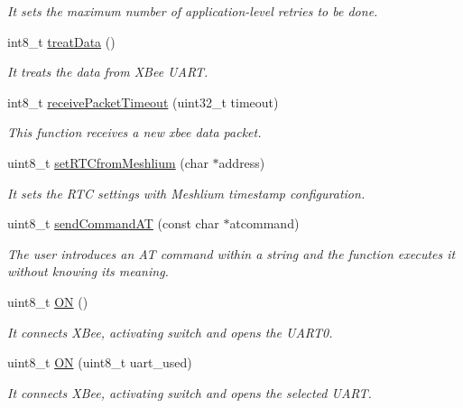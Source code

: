 \begin{DoxyCompactItemize}
\begin{DoxyCompactList}\small\item\em It sets the maximum number of application-\/level retries to be done. \end{DoxyCompactList}\item 
int8\+\_\+t \hyperlink{class_wasp_x_bee_core_ad926c5d5d906579b0be4de7623989cad}{treat\+Data} ()
\begin{DoxyCompactList}\small\item\em It treats the data from X\+Bee U\+A\+RT. \end{DoxyCompactList}\item 
int8\+\_\+t \hyperlink{class_wasp_x_bee_core_aecef582d03cbb816a14f6ff32a6d3520}{receive\+Packet\+Timeout} (uint32\+\_\+t timeout)
\begin{DoxyCompactList}\small\item\em This function receives a new xbee data packet. \end{DoxyCompactList}\item 
uint8\+\_\+t \hyperlink{class_wasp_x_bee_core_acfb2f381698ad1f7060e56386a8bd54f}{set\+R\+T\+Cfrom\+Meshlium} (char $\ast$address)
\begin{DoxyCompactList}\small\item\em It sets the R\+TC settings with Meshlium timestamp configuration. \end{DoxyCompactList}\item 
uint8\+\_\+t \hyperlink{class_wasp_x_bee_core_a1b1d5aa30b267e39cd601fe76405908a}{send\+Command\+AT} (const char $\ast$atcommand)
\begin{DoxyCompactList}\small\item\em The user introduces an AT command within a string and the function executes it without knowing its meaning. \end{DoxyCompactList}\item 
uint8\+\_\+t \hyperlink{class_wasp_x_bee_core_aaf3ee1510aab98a285b4a37359763892}{ON} ()
\begin{DoxyCompactList}\small\item\em It connects X\+Bee, activating switch and opens the U\+A\+R\+T0. \end{DoxyCompactList}\item 
uint8\+\_\+t \hyperlink{class_wasp_x_bee_core_a96542780bc4daa6a4c87f6e4a3361d23}{ON} (uint8\+\_\+t uart\+\_\+used)
\begin{DoxyCompactList}\small\item\em It connects X\+Bee, activating switch and opens the selected U\+A\+RT. \end{DoxyCompactList}\item 

\end{DoxyCompactItemize}
